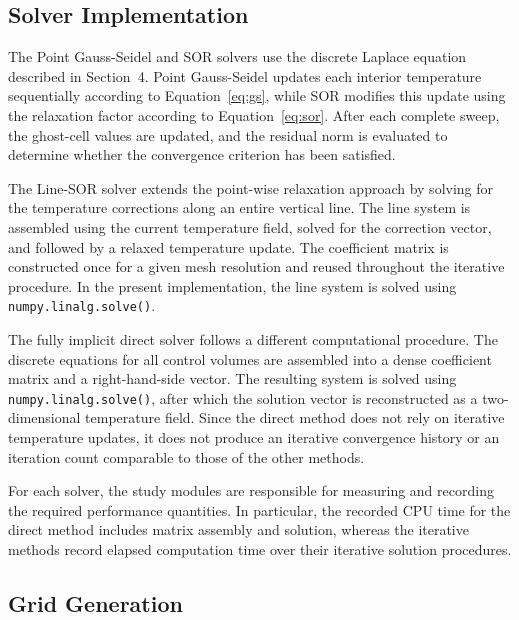 
\subsection{Solver Implementation}

The Point Gauss-Seidel and SOR solvers use the discrete Laplace equation described in Section~4. Point Gauss-Seidel updates each interior temperature sequentially according to Equation~\ref{eq:gs}, while SOR modifies this update using the relaxation factor according to Equation~\ref{eq:sor}. After each complete sweep, the ghost-cell values are updated, and the residual norm is evaluated to determine whether the convergence criterion has been satisfied.

The Line-SOR solver extends the point-wise relaxation approach by solving for the temperature corrections along an entire vertical line. The line system is assembled using the current temperature field, solved for the correction vector, and followed by a relaxed temperature update. The coefficient matrix is constructed once for a given mesh resolution and reused throughout the iterative procedure. In the present implementation, the line system is solved using \texttt{numpy.linalg.solve()}.

The fully implicit direct solver follows a different computational procedure. The discrete equations for all control volumes are assembled into a dense coefficient matrix and a right-hand-side vector. The resulting system is solved using \texttt{numpy.linalg.solve()}, after which the solution vector is reconstructed as a two-dimensional temperature field. Since the direct method does not rely on iterative temperature updates, it does not produce an iterative convergence history or an iteration count comparable to those of the other methods.

For each solver, the study modules are responsible for measuring and recording the required performance quantities. In particular, the recorded CPU time for the direct method includes matrix assembly and solution, whereas the iterative methods record elapsed computation time over their iterative solution procedures.


\subsection{Grid Generation}

